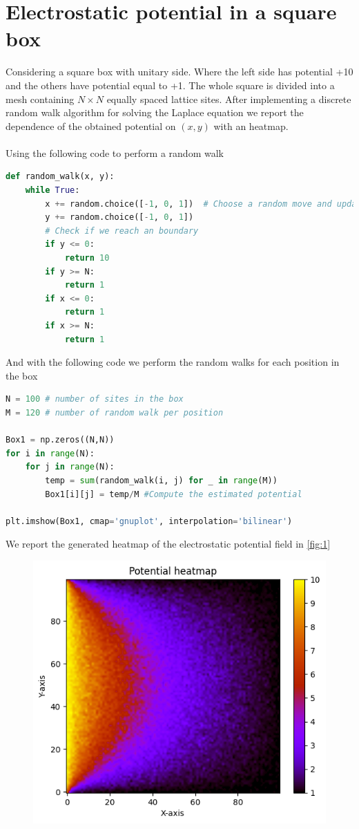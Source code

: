 \documentclass{article}
\begin{document}
\section{Electrostatic potential in a square box}
Considering a square box with unitary side. Where the left side has potential +10 and the others have potential equal to +1. The whole square is divided into a mesh containing $N\times N$ equally spaced lattice sites. After implementing a discrete random walk algorithm for solving the Laplace equation we report the dependence of the obtained potential on $(x,y)$ with an heatmap.\\\\
Using the following code to perform a random walk
\begin{lstlisting}[language=Python]
def random_walk(x, y):
    while True:
        x += random.choice([-1, 0, 1])  # Choose a random move and update the position
        y += random.choice([-1, 0, 1])
        # Check if we reach an boundary
        if y <= 0:
            return 10
        if y >= N:
            return 1
        if x <= 0:
            return 1
        if x >= N:
            return 1
\end{lstlisting}
\clearpage \noindent And with the following code we perform the random walks for each position in the box
\begin{lstlisting}[language=Python]
N = 100 # number of sites in the box
M = 120 # number of random walk per position

Box1 = np.zeros((N,N))
for i in range(N):
    for j in range(N):
        temp = sum(random_walk(i, j) for _ in range(M))
        Box1[i][j] = temp/M #Compute the estimated potential
        
plt.imshow(Box1, cmap='gnuplot', interpolation='bilinear')
\end{lstlisting}
We report the generated heatmap of the electrostatic potential field in \autoref{fig:1}
\begin{figure}[H]
    \centering
    \includegraphics[width=.7\linewidth]{images/Figure1.png}
    \caption{}
    \label{fig:1}
\end{figure}
\clearpage
\end{document}
